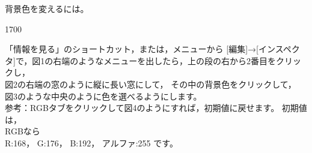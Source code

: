 \documentclass[dvipdfmx]{jarticle}%
\begin{document}
背景色を変えるには。\\

\begin{layer}{170}{0}
\end{layer}


\begin{minipage}{.38\textwidth}{「情報を見る」のショートカット，または，メニューから
[編集]→[インスペクタ]で，図1の右端のようなメニューを出したら，上の段の右から2番目をクリックし，\\
図2の右端の窓のように縦に長い窓にして，
その中の背景色をクリックして，\\
図3のような中央のように色を選べるようにします。\\
参考：RGBタブをクリックして図4のようにすれば，初期値に戻せます。
初期値は，\\
RGBなら\\
R:168，
G:176，
B:192，
アルファ:255
です。}
\end{minipage}
\end{document}

